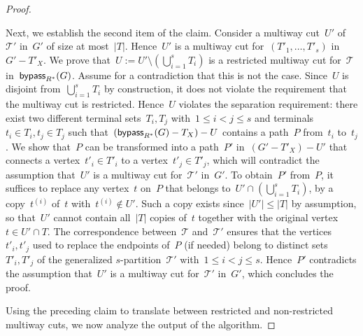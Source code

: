 \begin{proof}
\begin{claimproof}
Next, we establish the second item of the claim. Consider a multiway cut~$U'$ of~$\mathcal{T}'$ in~$G'$ of size at most~$|T|$. Hence~$U'$ is a multiway cut for~$(T'_1, \ldots, T'_s)$ in~$G' - T'_X$. We prove that~$U := U' \setminus (\bigcup _{i=1}^s T_i)$ is a restricted multiway cut for~$\mathcal{T}$ in~$\mathsf{bypass}_{R^*}(G)$. Assume for a contradiction that this is not the case. Since~$U$ is disjoint from~$\bigcup_{i=1}^s T_i$ by construction, it does not violate the requirement that the multiway cut is restricted. Hence~$U$ violates the separation requirement: there exist two different terminal sets~$T_i, T_j$ with~$1 \leq i < j \leq s$ and terminals~$t_i \in T_i, t_j \in T_j$ such that~$(\mathsf{bypass}_{R^*}(G) - T_X) - U$ contains a path~$P$ from~$t_i$ to~$t_j$. We show that~$P$ can be transformed into a path~$P'$ in~$(G' - T'_X) - U'$ that connects a vertex~$t'_i \in T'_i$ to a vertex~$t'_j \in T'_j$, which will contradict the assumption that~$U'$ is a multiway cut for~$\mathcal{T}'$ in~$G'$. To obtain~$P'$ from~$P$, it suffices to replace any vertex~$t$ on~$P$ that belongs to~$U' \cap (\bigcup _{i=1}^s T_i)$, by a copy~$t^{(i)}$ of~$t$ with~$t^{(i)} \notin U'$. Such a copy exists since~$|U'| \leq |T|$ by assumption, so that~$U'$ cannot contain all~$|T|$ copies of~$t$ together with the original vertex~$t \in U' \cap T$. The correspondence between~$\mathcal{T}$ and~$\mathcal{T}'$ ensures that the vertices~$t'_i, t'_j$ used to replace the endpoints of~$P$ (if needed) belong to distinct sets~$T'_i, T'_j$ of the generalized $s$-partition~$\mathcal{T}'$ with~$1 \leq i < j \leq s$. Hence~$P'$ contradicts the assumption that~$U'$ is a multiway cut for~$\mathcal{T}'$ in~$G'$, which concludes the proof.
\end{claimproof}

Using the preceding claim to translate between restricted and non-restricted multiway cuts, we now analyze the output of the algorithm.


\end{proof}
